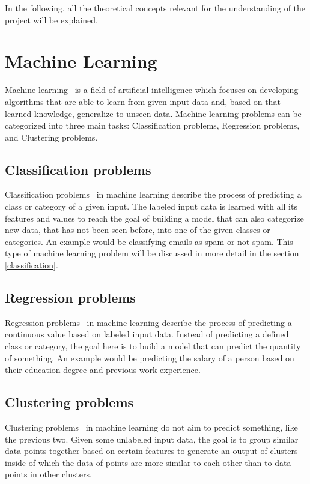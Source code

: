 
In the following, all the theoretical concepts relevant for the understanding of the project will be explained.

\section{Machine Learning}
Machine learning~\cite{machine_learning} is a field of artificial intelligence which focuses on developing algorithms that are able to learn from given input data and, based on that learned knowledge, generalize to unseen data. Machine learning problems can be categorized into three main tasks: Classification problems, Regression problems, and Clustering problems.

\subsection{Classification problems} \label{classification_problems}
Classification problems~\cite{classification_regression} in machine learning describe the process of predicting a class or category of a given input. The labeled input data is learned with all its features and values to reach the goal of building a model that can also categorize new data, that has not been seen before, into one of the given classes or categories. An example would be classifying emails as spam or not spam. This type of machine learning problem will be discussed in more detail in the section \ref{classification}.

\subsection{Regression problems}
Regression problems~\cite{classification_regression} in machine learning describe the process of predicting a continuous value based on labeled input data. Instead of predicting a defined class or category, the goal here is to build a model that can predict the quantity of something. An example would be predicting the salary of a person based on their education degree and previous work experience.

\subsection{Clustering problems}
Clustering problems~\cite{clustering} in machine learning do not aim to predict something, like the previous two. Given some unlabeled input data, the goal is to group similar data points together based on certain features to generate an output of clusters inside of which the data of points are more similar to each other than to data points in other clusters.

